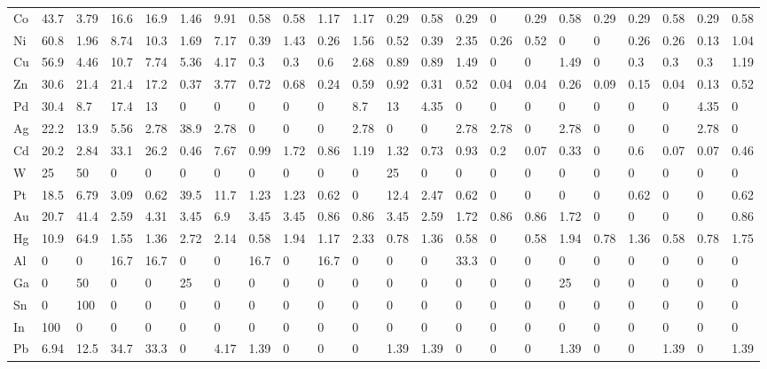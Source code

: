 \begin{tabular}{llllllllllllllllllllll}
	Co & 43.7 & 3.79 & 16.6 & 16.9 & 1.46 & 9.91 & 0.58 & 0.58 & 1.17 & 1.17 & 0.29 & 0.58 & 0.29 & 0    & 0.29 & 0.58 & 0.29 & 0.29 & 0.58 & 0.29 & 0.58 \\
	Ni & 60.8 & 1.96 & 8.74 & 10.3 & 1.69 & 7.17 & 0.39 & 1.43 & 0.26 & 1.56 & 0.52 & 0.39 & 2.35 & 0.26 & 0.52 & 0    & 0    & 0.26 & 0.26 & 0.13 & 1.04 \\
	Cu & 56.9 & 4.46 & 10.7 & 7.74 & 5.36 & 4.17 & 0.3  & 0.3  & 0.6  & 2.68 & 0.89 & 0.89 & 1.49 & 0    & 0    & 1.49 & 0    & 0.3  & 0.3  & 0.3  & 1.19 \\
	Zn & 30.6 & 21.4 & 21.4 & 17.2 & 0.37 & 3.77 & 0.72 & 0.68 & 0.24 & 0.59 & 0.92 & 0.31 & 0.52 & 0.04 & 0.04 & 0.26 & 0.09 & 0.15 & 0.04 & 0.13 & 0.52 \\
	Pd & 30.4 & 8.7  & 17.4 & 13   & 0    & 0    & 0    & 0    & 0    & 8.7  & 13   & 4.35 & 0    & 0    & 0    & 0    & 0    & 0    & 0    & 4.35 & 0    \\
	Ag & 22.2 & 13.9 & 5.56 & 2.78 & 38.9 & 2.78 & 0    & 0    & 0    & 2.78 & 0    & 0    & 2.78 & 2.78 & 0    & 2.78 & 0    & 0    & 0    & 2.78 & 0    \\
	Cd & 20.2 & 2.84 & 33.1 & 26.2 & 0.46 & 7.67 & 0.99 & 1.72 & 0.86 & 1.19 & 1.32 & 0.73 & 0.93 & 0.2  & 0.07 & 0.33 & 0    & 0.6  & 0.07 & 0.07 & 0.46 \\
	W  & 25   & 50   & 0    & 0    & 0    & 0    & 0    & 0    & 0    & 0    & 25   & 0    & 0    & 0    & 0    & 0    & 0    & 0    & 0    & 0    & 0    \\
	Pt & 18.5 & 6.79 & 3.09 & 0.62 & 39.5 & 11.7 & 1.23 & 1.23 & 0.62 & 0    & 12.4 & 2.47 & 0.62 & 0    & 0    & 0    & 0    & 0.62 & 0    & 0    & 0.62 \\
	Au & 20.7 & 41.4 & 2.59 & 4.31 & 3.45 & 6.9  & 3.45 & 3.45 & 0.86 & 0.86 & 3.45 & 2.59 & 1.72 & 0.86 & 0.86 & 1.72 & 0    & 0    & 0    & 0    & 0.86 \\
	Hg & 10.9 & 64.9 & 1.55 & 1.36 & 2.72 & 2.14 & 0.58 & 1.94 & 1.17 & 2.33 & 0.78 & 1.36 & 0.58 & 0    & 0.58 & 1.94 & 0.78 & 1.36 & 0.58 & 0.78 & 1.75 \\
	Al & 0    & 0    & 16.7 & 16.7 & 0    & 0    & 16.7 & 0    & 16.7 & 0    & 0    & 0    & 33.3 & 0    & 0    & 0    & 0    & 0    & 0    & 0    & 0    \\
	Ga & 0    & 50   & 0    & 0    & 25   & 0    & 0    & 0    & 0    & 0    & 0    & 0    & 0    & 0    & 0    & 25   & 0    & 0    & 0    & 0    & 0    \\
	Sn & 0    & 100  & 0    & 0    & 0    & 0    & 0    & 0    & 0    & 0    & 0    & 0    & 0    & 0    & 0    & 0    & 0    & 0    & 0    & 0    & 0    \\
	In & 100  & 0    & 0    & 0    & 0    & 0    & 0    & 0    & 0    & 0    & 0    & 0    & 0    & 0    & 0    & 0    & 0    & 0    & 0    & 0    & 0    \\
	Pb & 6.94 & 12.5 & 34.7 & 33.3 & 0    & 4.17 & 1.39 & 0    & 0    & 0    & 1.39 & 1.39 & 0    & 0    & 0    & 1.39 & 0    & 0    & 1.39 & 0    & 1.39 \\
	\bottomrule
\end{tabular}